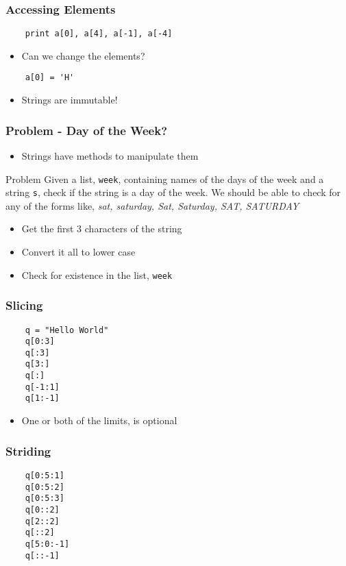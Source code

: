 \begin{frame}[fragile]
  \frametitle{Accessing Elements}
  \begin{lstlisting}
    print a[0], a[4], a[-1], a[-4]
  \end{lstlisting}
  \begin{itemize}
  \item Can we change the elements?
  \end{itemize}
  \begin{lstlisting}
    a[0] = 'H'
  \end{lstlisting}
  \begin{itemize}
  \item Strings are immutable!
  \end{itemize}
\end{frame}

\begin{frame}[fragile]
  \frametitle{Problem - Day of the Week?}
  \begin{itemize}
  \item Strings have methods to manipulate them
  \end{itemize}
  \begin{block}{Problem}
    Given a list, \texttt{week}, containing names of the days of the
    week and a string \texttt{s}, check if the string is a day of the
    week. We should be able to check for any of the forms like,
    \emph{sat, saturday, Sat, Saturday, SAT, SATURDAY}
  \end{block}
  \begin{itemize}
  \item Get the first 3 characters of the string
  \item Convert it all to lower case
  \item Check for existence in the list, \texttt{week}
  \end{itemize}
\end{frame}

\begin{frame}[fragile]
  \frametitle{Slicing}
  \begin{lstlisting}
    q = "Hello World"
    q[0:3]
    q[:3]
    q[3:]
    q[:]
    q[-1:1]
    q[1:-1]
  \end{lstlisting}
  \begin{itemize}
  \item One or both of the limits, is optional
  \end{itemize}
\end{frame}

\begin{frame}[fragile]
  \frametitle{Striding}
  \begin{lstlisting}
    q[0:5:1]
    q[0:5:2]
    q[0:5:3]
    q[0::2]
    q[2::2]
    q[::2]
    q[5:0:-1]
    q[::-1]
  \end{lstlisting}
\end{frame}

